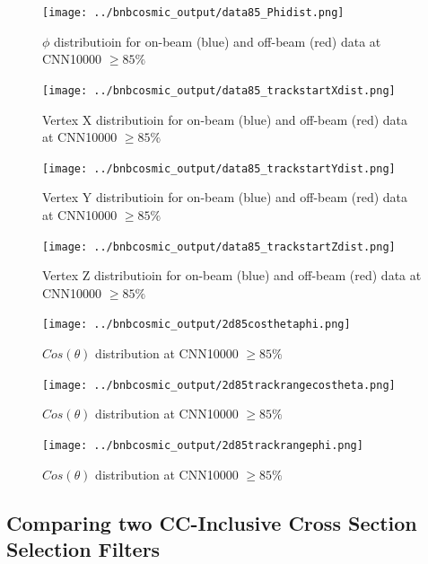 \begin{figure}[htp!]
\centering
\texttt{[image: ../bnbcosmic\_output/data85\_Phidist.png]}
\caption{$\phi$ distributioin for on-beam (blue) and off-beam (red) data at CNN10000 $\geq 85\%$} 
\label{fig:dataphi}
\end{figure}


\begin{figure}[htp!]
\centering
\texttt{[image: ../bnbcosmic\_output/data85\_trackstartXdist.png]}
\caption{Vertex X distributioin for on-beam (blue) and off-beam (red) data at CNN10000 $\geq 85\%$} 
\label{fig:dataX}
\end{figure}

\begin{figure}[htp!]
\centering
\texttt{[image: ../bnbcosmic\_output/data85\_trackstartYdist.png]}
\caption{Vertex Y distributioin for on-beam (blue) and off-beam (red) data at CNN10000 $\geq 85\%$} 
\label{fig:dataY}
\end{figure}

\begin{figure}[htp!]
\centering
\texttt{[image: ../bnbcosmic\_output/data85\_trackstartZdist.png]}
\caption{Vertex Z distributioin for on-beam (blue) and off-beam (red) data at CNN10000 $\geq 85\%$} 
\label{fig:dataZ}
\end{figure}

\begin{figure}[htp!]
\centering
\texttt{[image: ../bnbcosmic\_output/2d85costhetaphi.png]}
\caption{$Cos(\theta)$ distribution at CNN10000 $\geq 85\%$} 
\label{fig:2d85costhetaphi}
\end{figure}

\begin{figure}[htp!]
\centering
\texttt{[image: ../bnbcosmic\_output/2d85trackrangecostheta.png]}
\caption{$Cos(\theta)$ distribution at CNN10000 $\geq 85\%$} 
\label{fig:2d85trackrangecostheta}
\end{figure}

\begin{figure}[htp!]
\centering
\texttt{[image: ../bnbcosmic\_output/2d85trackrangephi.png]}
\caption{$Cos(\theta)$ distribution at CNN10000 $\geq 85\%$} 
\label{fig:2d85trackrangephi}
\end{figure}
\subsection{Comparing two CC-Inclusive Cross Section Selection Filters}
